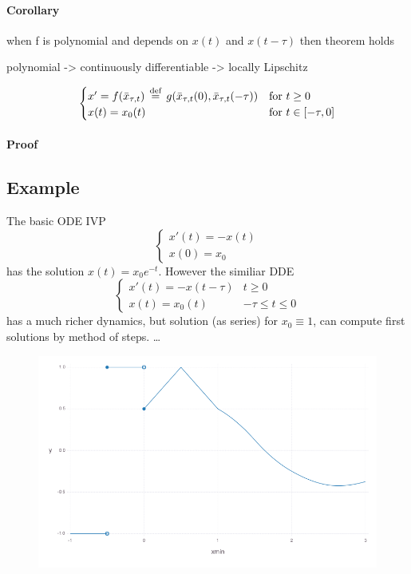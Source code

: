 \documentclass[10pt]{article}
\begin{document}
\paragraph{Corollary}\label{corollary}
when f is polynomial and depends on $x(t)$ and $x(t-\tau)$ then theorem holds

polynomial -\textgreater{} continuously differentiable -\textgreater{} locally Lipschitz


\begin{equation}
    \begin{cases}
        x'=f(\bar{x}_{\tau,t})\,\stackrel{\text{def}}{=}\, g(\bar{x}_{\tau,t}(0),\bar{x}_{\tau,t}(-\tau)) &\text{for } t\geq 0\\
        x(t)=x_0(t) & \text{for } t\in[-\tau,0]
    \end{cases}
\end{equation}

\paragraph{Proof}\label{proof-2}

\subsection{Example}\label{example}
The basic ODE IVP
\begin{equation}
    \begin{cases}
        x'(t) = -x(t)\\
        x(0) = x_0
    \end{cases}
\end{equation}
has the solution $x(t)=x_0 e^{-t}$. However the similiar DDE
\begin{equation}
    \begin{cases}
        x'(t) = -x(t-\tau) & t\geq 0\\
        x(t) = x_0(t) & -\tau\leq t\leq 0
    \end{cases}
\end{equation}
has a much richer dynamics, but solution (as series) for $x_0\equiv 1$, can compute first solutions by method of steps. \ldots{}

\begin{figure}[h]\centering
    \includegraphics[width=\textwidth]{piecewise-initial-function.png}
	\label{fig:not-allowed}
\end{figure}
\end{document}
